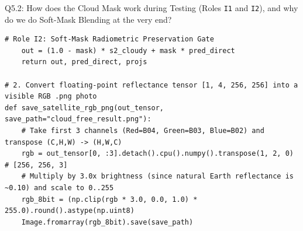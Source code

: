 \documentclass[11pt,a4paper]{article}
\begin{document}
\begin{qbox}{Q5.2: How does the Cloud Mask work during Testing (Roles \texttt{I1} and \texttt{I2}), and why do we do Soft-Mask Blending at the very end?}
\begin{lstlisting}[caption={Complete Inference Forward Pass, Soft-Mask Blending (Role I2), and PNG Image Conversion}]
    # Role I2: Soft-Mask Radiometric Preservation Gate
    out = (1.0 - mask) * s2_cloudy + mask * pred_direct
    return out, pred_direct, projs

# 2. Convert floating-point reflectance tensor [1, 4, 256, 256] into a visible RGB .png photo
def save_satellite_rgb_png(out_tensor, save_path="cloud_free_result.png"):
    # Take first 3 channels (Red=B04, Green=B03, Blue=B02) and transpose (C,H,W) -> (H,W,C)
    rgb = out_tensor[0, :3].detach().cpu().numpy().transpose(1, 2, 0) # [256, 256, 3]
    # Multiply by 3.0x brightness (since natural Earth reflectance is ~0.10) and scale to 0..255
    rgb_8bit = (np.clip(rgb * 3.0, 0.0, 1.0) * 255.0).round().astype(np.uint8)
    Image.fromarray(rgb_8bit).save(save_path)
\end{lstlisting}
\end{qbox}
\end{document}

